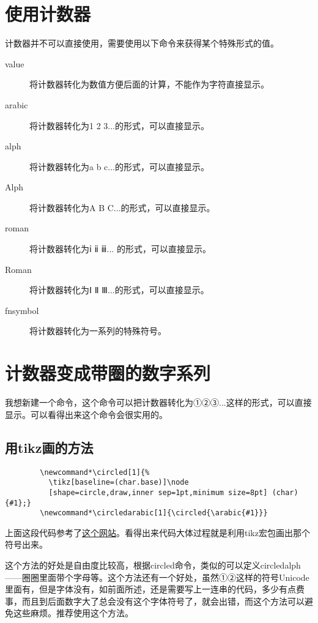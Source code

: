 \documentclass[11pt,oneside]{book}
\begin{document}
      \section{使用计数器}
      计数器并不可以直接使用，需要使用以下命令来获得某个特殊形式的值。
      \begin{description}
      \item[value] 将计数器转化为数值方便后面的计算，不能作为字符直接显示。
      \item[arabic] 将计数器转化为1 2 3...的形式，可以直接显示。
      \item[alph] 将计数器转化为a b c...的形式，可以直接显示。
      \item[Alph] 将计数器转化为A B C...的形式，可以直接显示。
      \item[roman] 将计数器转化为ⅰ ⅱ ⅲ... 的形式，可以直接显示。
      \item[Roman] 将计数器转化为Ⅰ Ⅱ Ⅲ...的形式，可以直接显示。
      \item[fnsymbol] 将计数器转化为一系列的特殊符号。
      \end{description}

      \section{计数器变成带圈的数字系列}
      我想新建一个命令，这个命令可以把计数器转化为①②③...这样的形式，可以直接显示。可以看得出来这个命令会很实用的。

      \subsection{用tikz画的方法}
      \begin{Verbatim}
        \newcommand*\circled[1]{%
          \tikz[baseline=(char.base)]\node
          [shape=circle,draw,inner sep=1pt,minimum size=8pt] (char) {#1};}
        \newcommand*\circledarabic[1]{\circled{\arabic{#1}}}
      \end{Verbatim}

      上面这段代码参考了\href{http://tex.stackexchange.com/questions/133264/circled-footnote-symbols-with-pifont-showing-arrows-instead-of-circled-numbers}{这个网站}。看得出来代码大体过程就是利用tikz宏包画出那个符号出来。

      这个方法的好处是自由度比较高，根据circled命令，类似的可以定义circledalph——圈圈里面带个字母等。这个方法还有一个好处，虽然①②这样的符号Unicode里面有，但是字体没有，如前面所述，还是需要写上一连串的代码，多少有点费事，而且到后面数字大了总会没有这个字体符号了，就会出错，而这个方法可以避免这些麻烦。推荐使用这个方法。
\end{document}
